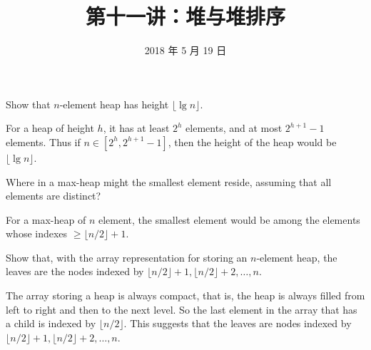 \documentclass[12pt, a4paper, UTF8]{ctexart}
\title{第十一讲：堆与堆排序}
\date{2018 年 5 月 19 日}     %
\begin{document}
\maketitle
\noplagiarism	%
\beginrequired	%

\begin{problem}[TC: 6.1-2]	%
  Show that $n$-element heap has height $\lfloor\lg n\rfloor$.
\end{problem}



\begin{solution}
  For a heap of height $h$, it has at least $2^{h}$ elements, and at 
  most $2^{h+1} - 1$ elements. Thus if $n\in [2^{h},2^{h+1}-1]$, then 
  the height of the heap would be $\lfloor\lg n\rfloor$.
\end{solution}

\begin{problem}[TC: 6.1-4]
  Where in a max-heap might the smallest element reside, assuming that 
  all elements are distinct?
\end{problem}

\begin{solution}
  For a max-heap of $n$ element, the smallest element would be among 
  the elements whose indexes $\geq \lfloor n/2\rfloor + 1$.
\end{solution}
\begin{problem}[TC: 6.1-7]
  Show that, with the array representation for storing an $n$-element 
  heap, the leaves are the nodes indexed by $\lfloor n/2\rfloor+1,\lfloor n/2\rfloor+2,\ldots,n$.
\end{problem}


\begin{solution}
  The array storing a heap is always compact, that is, the heap is 
  always filled from left to right and then to the next level. So the 
  last element in the array that has a child is indexed by $\lfloor n/2\rfloor$. 
  This suggests that the leaves are nodes indexed by $\lfloor n/2\rfloor+1,\lfloor n/2\rfloor+2,\ldots,n$.
\end{solution}
\end{document}
